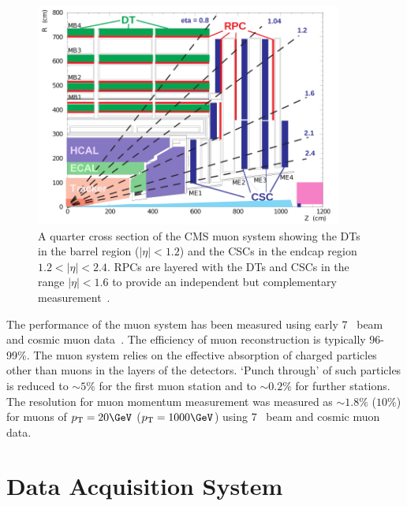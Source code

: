 \begin{figure}
\centering
    \includegraphics[width=0.9\textwidth]{./Figures/detector/muon_sys}
  \caption{A quarter cross section of the CMS muon system showing the DTs in the barrel region ($|\eta| < 1.2$) and the CSCs in the endcap
  region $ 1.2 < |\eta| < 2.4$. RPCs are layered with the DTs and CSCs in the range $|\eta| < 1.6$ to provide an independent but complementary measurement~\cite{CMS}.}
  \label{fig:MUON_SLICE}
\end{figure}

The performance of the muon system has been measured using early 7 \TeV~beam and cosmic muon data~\cite{muon_performance}. 
The efficiency of muon reconstruction is typically 96-99\%. The muon system relies on the effective
absorption of charged particles other than muons in the layers of the detectors.
`Punch through' of such particles is reduced to $\sim 5\%$ for the first muon station and to
$\sim 0.2\%$ for further stations. The resolution for muon momentum measurement
was measured as $\sim 1.8\%$ ($10\%$) for muons of $\pt=20\GeV$ ($\pt=1000\GeV$) using 7 \TeV~beam and cosmic muon data. 

\section{Data Acquisition System}

